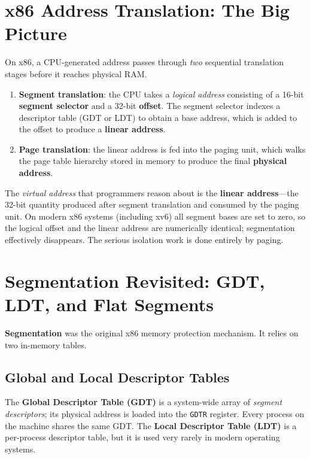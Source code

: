 \documentclass[11pt]{article}
\begin{document}
\section{x86 Address Translation: The Big Picture}

On x86, a CPU-generated address passes through \emph{two} sequential translation stages before it reaches physical RAM.

\begin{enumerate}
    \item \textbf{Segment translation}: the CPU takes a \emph{logical address} consisting of a 16-bit \textbf{segment selector} and a 32-bit \textbf{offset}. The segment selector indexes a descriptor table (GDT or LDT) to obtain a base address, which is added to the offset to produce a \textbf{linear address}.
    \item \textbf{Page translation}: the linear address is fed into the paging unit, which walks the page table hierarchy stored in memory to produce the final \textbf{physical address}.
\end{enumerate}

The \emph{virtual address} that programmers reason about is the \textbf{linear address}---the 32-bit quantity produced after segment translation and consumed by the paging unit. On modern x86 systems (including xv6) all segment bases are set to zero, so the logical offset and the linear address are numerically identical; segmentation effectively disappears. The serious isolation work is done entirely by paging.

\section{Segmentation Revisited: GDT, LDT, and Flat Segments}

\textbf{Segmentation} was the original x86 memory protection mechanism. It relies on two in-memory tables.

\subsection{Global and Local Descriptor Tables}

The \textbf{Global Descriptor Table (GDT)} is a system-wide array of \emph{segment descriptors}; its physical address is loaded into the \texttt{GDTR} register. Every process on the machine shares the same GDT. The \textbf{Local Descriptor Table (LDT)} is a per-process descriptor table, but it is used very rarely in modern operating systems.
\end{document}
